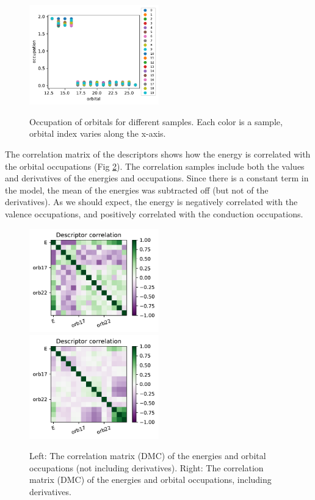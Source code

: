 \begin{figure}[h!]
\includegraphics[width=0.5\textwidth]{images/dmc_lowen_descriptors.pdf}
\label{fig:descriptors}
\caption{Occupation of orbitals for different samples. Each color is a sample, orbital index varies along the x-axis.}
\end{figure}

The correlation matrix of the descriptors shows how the energy is correlated with the orbital occupations (Fig \ref{fig:descriptors_corrmat}).
The correlation samples include both the values and derivatives of the energies and occupations.
Since there is a constant term in the model, the mean of the energies was subtracted off (but not of the derivatives).
As we should expect, the energy is negatively correlated with the valence occupations, and positively correlated with the conduction occupations.

\begin{figure}[h!]
\includegraphics[width=0.5\textwidth]{images/dmc_lowen_corrmat.pdf}
\includegraphics[width=0.5\textwidth]{images/dmc_allderivs_lowen_corrmat.pdf}
\label{fig:descriptors_corrmat}
\caption{
Left: The correlation matrix (DMC) of the energies and orbital occupations (not including derivatives). 
Right: The correlation matrix (DMC) of the energies and orbital occupations, including derivatives.}
\end{figure}

